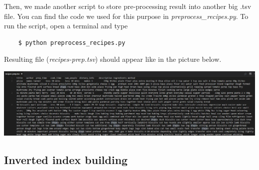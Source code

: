 Then, we made another script to store pre-processing result into another big .tsv file. You can find the code we used for this purpose in \textit{preprocess\_recipes.py}. To run the script, open a terminal and type
\begin{lstlisting}
	$ python preprocess_recipes.py
\end{lstlisting}
Resulting file (\textit{recipes-prep.tsv}) should appear like in the picture below.
\begin{center}
	\vspace{5mm}
	\includegraphics[scale=0.3]{img/recipes-prep-tsv.jpg}
\end{center}


\subsection{Inverted index building}

